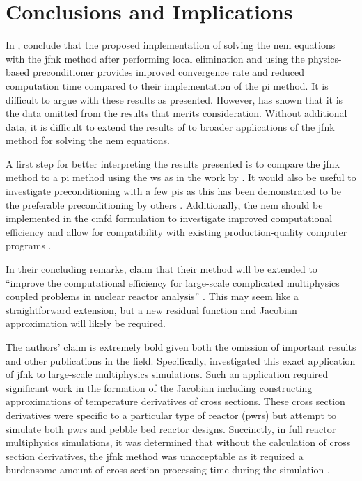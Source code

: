 \section{Conclusions and Implications}
\label{sec:conclusion}

  In , \citeauthor{qe2paper} conclude that the proposed
  implementation of solving the \gls{nem} equations with the \gls{jfnk} method
  after performing local elimination and using the physics-based preconditioner
  provides improved convergence rate and reduced computation time compared to
  their implementation of the \gls{pi} method. It is difficult to argue with
  these results as presented. However,  has shown that it is
  the data omitted from the results that merits consideration. Without
  additional data, it is difficult to extend the results of
  \citeauthor{qe2paper} to broader applications of the \gls{jfnk} method for
  solving the \gls{nem} equations.

  A first step for better interpreting the results presented is to compare the
  \gls{jfnk} method to a \gls{pi} method using the \gls{ws} as in the work by
  \citeauthor{jfnk_wielandt}. It would also be useful to investigate
  preconditioning with a few \glspl{pi} as this has been demonstrated to be the
  preferable preconditioning by others \cite{gill_azmy,jfnk_wielandt}.
  Additionally, the \gls{nem} should be implemented in the \gls{cmfd}
  formulation to investigate improved computational efficiency and allow for
  compatibility with existing production-quality computer programs 
  \cite{palmtagThesis,smith_nonlinear}.

  In their concluding remarks, \citeauthor{qe2paper} claim that their method
  will be extended to ``improve the computational efficiency for large-scale
  complicated multiphysics coupled problems in nuclear reactor analysis''
  \cite{qe2paper}. This may seem like a straightforward extension, but a new
  residual function and Jacobian approximation will likely be required.

  The authors' claim is extremely bold given both the omission of important
  results and other publications in the field. Specifically,
  \citeauthor{caslJFNK} investigated this exact application of \gls{jfnk} to
  large-scale multiphysics simulations. Such an application required significant
  work in the formation of the Jacobian including constructing approximations of
  temperature derivatives of cross sections. These cross section derivatives
  were specific to a particular type of reactor (\glspl{pwr}) but
  \citeauthor{qe2paper} attempt to simulate both \glspl{pwr} and pebble bed
  reactor designs. Succinctly, in full reactor multiphysics simulations, it was
  determined that without the calculation of cross section derivatives, the
  \gls{jfnk} method was unacceptable as it required a burdensome amount of cross
  section processing time during the simulation \cite{caslJFNK}.

